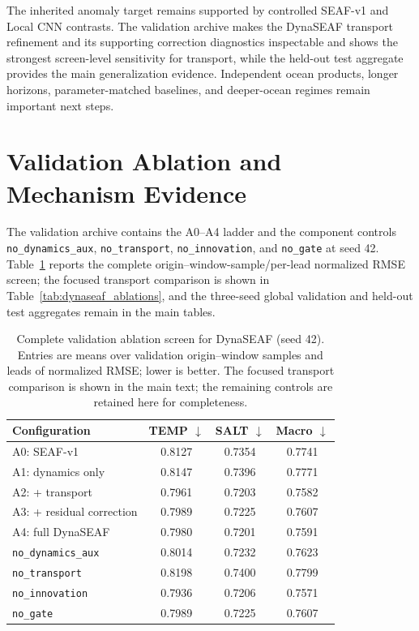 \documentclass[conference]{IEEEtran}
\begin{document}
The inherited anomaly target remains supported by controlled SEAF-v1 and Local CNN contrasts. The validation archive makes the DynaSEAF transport refinement and its supporting correction diagnostics inspectable and shows the strongest screen-level sensitivity for transport, while the held-out test aggregate provides the main generalization evidence. Independent ocean products, longer horizons, parameter-matched baselines, and deeper-ocean regimes remain important next steps.

\appendices
\section{Validation Ablation and Mechanism Evidence}
\label{sec:appendix_validation_ablation}
The validation archive contains the A0--A4 ladder and the component controls \texttt{no\_dynamics\_aux}, \texttt{no\_transport}, \texttt{no\_innovation}, and \texttt{no\_gate} at seed 42. Table~\ref{tab:dynaseaf_ablations_full} reports the complete origin--window-sample/per-lead normalized RMSE screen; the focused transport comparison is shown in Table~\ref{tab:dynaseaf_ablations}, and the three-seed global validation and held-out test aggregates remain in the main tables.

\begin{table}[!t]
\centering
\caption{Complete validation ablation screen for DynaSEAF (seed 42). Entries are means over validation origin--window samples and leads of normalized RMSE; lower is better. The focused transport comparison is shown in the main text; the remaining controls are retained here for completeness.}
\label{tab:dynaseaf_ablations_full}
\scriptsize
\setlength{\tabcolsep}{3.0pt}
\renewcommand{\arraystretch}{1.05}
\begin{tabular}{lccc}
\toprule
Configuration & TEMP $\downarrow$ & SALT $\downarrow$ & Macro $\downarrow$\\
\midrule
A0: SEAF-v1 & 0.8127 & 0.7354 & 0.7741\\
A1: dynamics only & 0.8147 & 0.7396 & 0.7771\\
A2: + transport & 0.7961 & 0.7203 & 0.7582\\
A3: + residual correction & 0.7989 & 0.7225 & 0.7607\\
A4: full DynaSEAF & 0.7980 & 0.7201 & 0.7591\\
\texttt{no\_dynamics\_aux} & 0.8014 & 0.7232 & 0.7623\\
\texttt{no\_transport} & 0.8198 & 0.7400 & 0.7799\\
\texttt{no\_innovation} & 0.7936 & 0.7206 & 0.7571\\
\texttt{no\_gate} & 0.7989 & 0.7225 & 0.7607\\
\bottomrule
\end{tabular}
\end{table}
\end{document}
